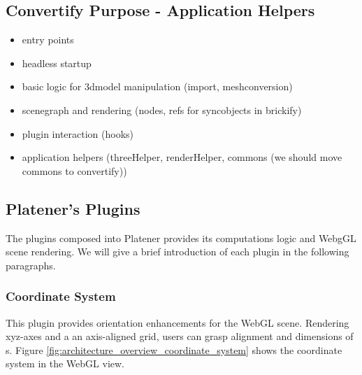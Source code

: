 \documentclass[../ClassicThesis.tex]{subfiles}
\begin{document}
\subsection{Convertify Purpose - Application Helpers}

\begin{itemize}
\item entry points
\item headless startup
\item basic logic for 3dmodel manipulation (import, meshconversion)
\item scenegraph and rendering (nodes, refs for syncobjects in brickify)
\item plugin interaction (hooks)
\item application helpers (threeHelper, renderHelper, commons (we should move commons to convertify))
\end{itemize}

\subsection{Platener's Plugins}


The plugins composed into Platener provides its computations logic and WebgGL scene rendering. We will give a brief introduction of each plugin in the following paragraphs.

\subsubsection{Coordinate System}

This plugin provides orientation enhancements for the WebGL scene. Rendering xyz-axes and a an axis-aligned grid, users can grasp alignment and dimensions of {\threedmodel}s. Figure \ref{fig:architecture_overview_coordinate_system} shows the coordinate system in the WebGL view.
\end{document}

